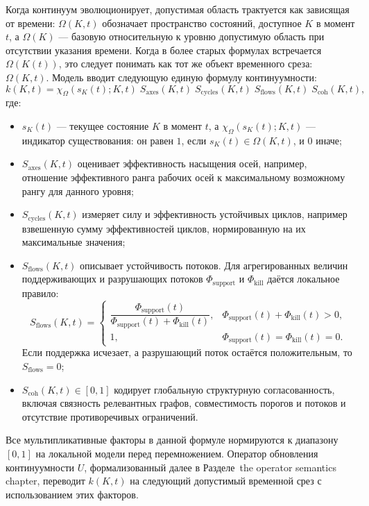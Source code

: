Когда континуум эволюционирует, допустимая область трактуется как зависящая от
времени:
\(\Omega(K,t)\) обозначает пространство состояний, доступное \(K\) в момент \(t\),
а \(\Omega(K)\) — базовую относительную к уровню допустимую область при отсутствии указания
времени.
Когда в более старых формулах встречается \(\Omega(K(t))\), это следует понимать как тот же
объект временного среза: \(\Omega(K,t)\).
Модель вводит следующую единую формулу континуумности:
\[
    k(K,t)
    = \chi_{\Omega}(s_K(t);K,t)\;
      S_{\mathrm{axes}}(K,t)\;
      S_{\mathrm{cycles}}(K,t)\;
      S_{\mathrm{flows}}(K,t)\;
      S_{\mathrm{coh}}(K,t),
\]
где:
\begin{itemize}
    \item \(s_K(t)\) — текущее состояние \(K\) в момент \(t\), а
          \(\chi_{\Omega}(s_K(t);K,t)\) — индикатор существования:
          он равен \(1\), если \(s_K(t)\in\Omega(K,t)\), и \(0\) иначе;
    \item \(S_{\mathrm{axes}}(K,t)\) оценивает эффективность насыщения осей, например,
          отношение эффективного ранга рабочих осей к максимальному возможному рангу для данного уровня;
    \item \(S_{\mathrm{cycles}}(K,t)\) измеряет силу и эффективность устойчивых циклов,
          например взвешенную сумму эффективностей циклов, нормированную на их максимальные значения;
    \item \(S_{\mathrm{flows}}(K,t)\) описывает устойчивость потоков. Для агрегированных
          величин поддерживающих и разрушающих потоков
          \(\Phi_{\mathrm{support}}\) и \(\Phi_{\mathrm{kill}}\) даётся локальное правило:
          \[
              S_{\mathrm{flows}}(K,t)=
              \begin{cases}
              \dfrac{\Phi_{\mathrm{support}}(t)}
                    {\Phi_{\mathrm{support}}(t)+\Phi_{\mathrm{kill}}(t)},
                    & \Phi_{\mathrm{support}}(t)+\Phi_{\mathrm{kill}}(t)>0,\\[0.7em]
              1, & \Phi_{\mathrm{support}}(t)=\Phi_{\mathrm{kill}}(t)=0.
              \end{cases}
          \]
          Если поддержка исчезает, а разрушающий поток остаётся положительным, то
          \(S_{\mathrm{flows}}=0\);
    \item \(S_{\mathrm{coh}}(K,t)\in[0,1]\) кодирует глобальную структурную согласованность,
          включая связность релевантных графов, совместимость порогов и потоков и отсутствие
          противоречивых ограничений.
\end{itemize}
Все мультипликативные факторы в данной формуле нормируются к диапазону \([0,1]\) на локальной модели
перед перемножением.
Оператор обновления континуумности \(U\), формализованный далее в Разделе~the operator semantics chapter,
переводит \(k(K,t)\) на следующий допустимый временной срез с использованием этих факторов.

